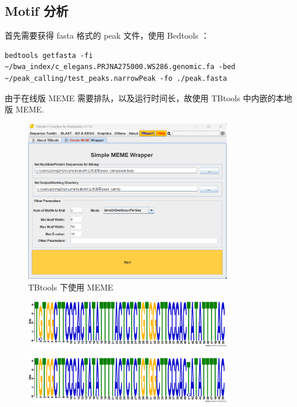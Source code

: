 \documentclass[UTF8]{ctexart}
\begin{document}
\subsection{Motif 分析}

首先需要获得 fasta 格式的 peak 文件，使用 Bedtools ：

\begin{lstlisting}
bedtools getfasta -fi ~/bwa_index/c_elegans.PRJNA275000.WS286.genomic.fa -bed ~/peak_calling/test_peaks.narrowPeak -fo ./peak.fasta
\end{lstlisting}

由于在线版 MEME 需要排队，以及运行时间长，故使用 TBtools 中内嵌的本地版 MEME.

\clearpage

\begin{figure}
	\centering
	\includegraphics[width=0.8\textwidth]{img/motif_analysis.png}
	\caption{TBtools 下使用 MEME}
\end{figure}

\begin{figure}
	\centering
	\includegraphics[width=0.8\textwidth]{img/meme_out/logo1.eps}
\end{figure}

\begin{figure}
	\centering
	\includegraphics[width=0.8\textwidth]{img/meme_out/logo2.eps}
\end{figure}
\end{document}
